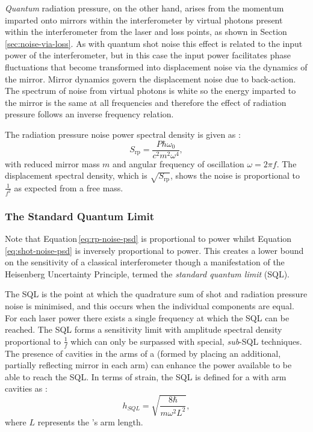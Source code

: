 \emph{Quantum} radiation pressure, on the other hand, arises from the momentum imparted onto mirrors within the interferometer by virtual photons present within the interferometer from the laser and loss points, as shown in Section\,\ref{sec:noise-via-loss}. As with quantum shot noise this effect is related to the input power of the interferometer, but in this case the input power facilitates phase fluctuations that become transformed into displacement noise via the dynamics of the mirror. Mirror dynamics govern the displacement noise due to back-action. The spectrum of noise from virtual photons is white so the energy imparted to the mirror is the same at all frequencies and therefore the effect of radiation pressure follows an inverse frequency relation.

The radiation pressure noise power spectral density is given as \cite{Danilishin2012}:
\begin{equation}
  \label{eq:rp-noise-psd}
  S_{\text{rp}} = \frac{P \hbar \omega_0}{c^2 m^2 \omega^4},
\end{equation}
with reduced mirror mass $m$ and angular frequency of oscillation $\omega = 2 \pi f$. The displacement spectral density, which is $\sqrt{S_{\text{rp}}}$, shows the noise is proportional to $\frac{1}{f^2}$ as expected from a free mass.

\subsubsection{\label{sec:sql}The Standard Quantum Limit}
Note that Equation\,\ref{eq:rp-noise-psd} is proportional to power whilst Equation\,\ref{eq:shot-noise-psd} is inversely proportional to power. This creates a lower bound on the sensitivity of a classical interferometer though a manifestation of the Heisenberg Uncertainty Principle, termed the \emph{standard quantum limit} (\gls{SQL}).

The \gls{SQL} is the point at which the quadrature sum of shot and radiation pressure noise is minimised, and this occurs when the individual components are equal. For each laser power there exists a single frequency at which the \gls{SQL} can be reached. The \gls{SQL} forms a sensitivity limit with amplitude spectral density proportional to $\frac{1}{f}$ which can only be surpassed with special, \emph{sub}-\gls{SQL} techniques. The presence of cavities in the arms of a \MI{} (formed by placing an additional, partially reflecting mirror in each arm) can enhance the power available to be able to reach the \gls{SQL}. In terms of strain, the \gls{SQL} is defined for a \MI{} with arm cavities as \cite{Braginsky1996}:
\begin{equation}
  \label{eq:strainsql}
  h_{SQL} = \sqrt{\frac{8 \hbar}{m \omega^2 L^2}},
\end{equation}
where $L$ represents the \MI{}'s arm length.

